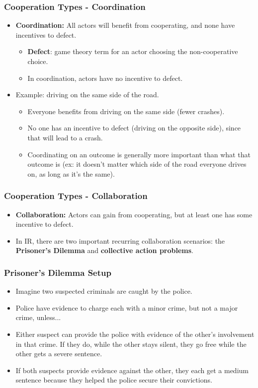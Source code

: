 \documentclass{beamer}
\begin{document}
\begin{frame} 
\frametitle{\LARGE{Cooperation Types - Coordination}}
     \begin{itemize}
         \item \textbf{Coordination:} All actors will benefit from cooperating, and none have incentives to defect. \pause
         \begin{itemize}
         	\item \textbf{Defect}: game theory term for an actor choosing the non-cooperative choice.
             \item In coordination, actors have no incentive to defect. \pause
         \end{itemize}
         \item Example: driving on the same side of the road. \pause
         \begin{itemize}
         	\item Everyone benefits from driving on the same side (fewer crashes). \pause
         	\item No one has an incentive to defect (driving on the opposite side), since that will lead to a crash. \pause
         	\item Coordinating on an outcome is generally more important than what that outcome is (ex: it doesn't matter which side of the road everyone drives on, as long as it's the same).
         \end{itemize}
     \end{itemize}
\end{frame}
     
\begin{frame} 
   	\frametitle{\LARGE{Cooperation Types - Collaboration}}
   	\begin{itemize} 
     \item \textbf{Collaboration:} Actors can gain from cooperating, but at least one has some incentive to defect. \pause
     \item In IR, there are two important recurring collaboration scenarios: the \textbf{Prisoner's Dilemma} and \textbf{collective action problems}.
 \end{itemize}
\end{frame}

 \begin{frame} 
 \frametitle{\LARGE{Prisoner's Dilemma Setup}}
 	\begin{itemize}
 		\item Imagine two suspected criminals are caught by the police. \pause
 		\item Police have evidence to charge each with a minor crime, but not a major crime, unless... \pause
 		\item Either suspect can provide the police with evidence of the other's involvement in that crime. If they do, while the other stays silent, they go free while the other gets a severe sentence. \pause
 		\item If both suspects provide evidence against the other, they each get a medium sentence because they helped the police secure their convictions.
 	\end{itemize}
 \end{frame}
\end{document}
